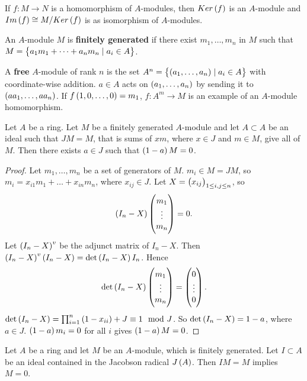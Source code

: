 \begin{definition}
If $ f : M \to N $ is a homomorphism of $ A $-modules, then $ Ker\br{f} $ is an $ A $-module and $ Im\br{f} \cong M / Ker\br{f} $ is as isomorphism of $ A $-modules.
\end{definition}

\begin{definition}
An $ A $-module $ M $ is \textbf{finitely generated} if there exist $ m_1, \dots, m_n $ in $ M $ such that $ M = \cbr{a_1m_1 + \dots + a_nm_n \mid a_i \in A} $.
\end{definition}

\begin{example*}
A \textbf{free} $ A $-module of rank $ n $ is the set $ A^n = \cbr{\br{a_1, \dots, a_n} \mid a_i \in A} $ with coordinate-wise addition. $ a \in A $ acts on $ \br{a_1, \dots, a_n} $ by sending it to $ \br{aa_1, \dots, aa_n} $. If $ f\br{1, 0, \dots, 0} = m_1 $, $ f : A^m \to M $ is an example of an $ A $-module homomorphism.
\end{example*}

\pagebreak

\begin{lemma}
\label{lem:8.7}
Let $ A $ be a ring. Let $ M $ be a finitely generated $ A $-module and let $ A \subset A $ be an ideal such that $ JM = M $, that is sums of $ xm $, where $ x \in J $ and $ m \in M $, give all of $ M $. Then there exists $ a \in J $ such that $ \br{1 - a}M = 0 $.
\end{lemma}

\begin{proof}
Let $ m_1, \dots, m_n $ be a set of generators of $ M $. $ m_i \in M = JM $, so $ m_i = x_{i1}m_1 + \dots + x_{in}m_n $, where $ x_{ij} \in J $. Let $ X = \br{x_{ij}}_{1 \le i, j \le n} $, so
$$ \br{I_n - X}\threebyone{m_1}{\vdots}{m_n} = 0. $$
Let $ \br{I_n - X}^v $ be the adjunct matrix of $ I_n - X $. Then $ \br{I_n - X}^v\br{I_n - X} = \det\br{I_n - X}I_n $. Hence
$$ \det\br{I_n - X}\threebyone{m_1}{\vdots}{m_n} = \threebyone{0}{\vdots}{0}. $$
$ \det\br{I_n - X} = \prod_{i = 1}^n \br{1 - x_{ii}} + J \equiv 1 \mod J $. So $ \det\br{I_n - X} = 1 - a $, where $ a \in J $. $ \br{1 - a}m_i = 0 $ for all $ i $ gives $ \br{1 - a}M = 0 $.
\end{proof}


\begin{corollary}
Let $ A $ be a ring and let $ M $ be an $ A $-module, which is finitely generated. Let $ I \subset A $ be an ideal contained in the Jacobson radical $ J\br{A} $. Then $ IM = M $ implies $ M = 0 $.
\end{corollary}

